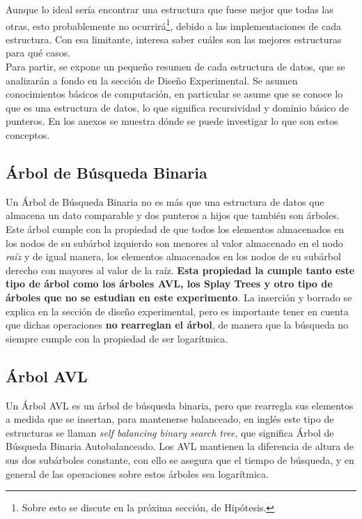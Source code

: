 \documentclass[12pt,letterpaper]{report}
\begin{document}
Aunque lo ideal sería encontrar una estructura que fuese mejor que todas las otras, esto probablemente no ocurrirá\footnote{Sobre esto se discute en la próxima sección, de Hipótesis.}, debido a las implementaciones de cada estructura. Con esa limitante, interesa saber cuáles son las mejores estructuras para qué casos.\\

Para partir, se expone un pequeño resumen de cada estructura de datos, que se analizarán a fondo en la sección de Diseño Experimental. Se asumen conocimientos básicos de computación, en particular se asume que se conoce lo que es una estructura de datos, lo que significa recursividad y dominio básico de punteros. En los anexos se muestra dónde se puede investigar lo que son estos conceptos.\\

\subsection{Árbol de Búsqueda Binaria}
\label{subsec:expl_abb}

Un Árbol de Búsqueda Binaria no es más que una estructura de datos que almacena un dato comparable y dos punteros a hijos que también son árboles. Este árbol cumple con la propiedad de que todos los elementos almacenados en los nodos de su subárbol izquierdo son menores al valor almacenado en el nodo \emph{raíz} y de igual manera, los elementos almacenados en los nodos de su subárbol derecho con mayores al valor de la raíz. \textbf{Esta propiedad la cumple tanto este tipo de árbol como los árboles AVL, los Splay Trees y otro tipo de árboles que no se estudian en este experimento}. La inserción y borrado se explica en la sección de diseño experimental, pero es importante tener en cuenta que dichas operaciones \textbf{no rearreglan el árbol}, de manera que la búsqueda no siempre cumple con la propiedad de ser logarítmica.

\subsection{Árbol AVL}
\label{subsec:expl_avl}
Un Árbol AVL es un árbol de búsqueda binaria, pero que rearregla sus elementos a medida que se insertan, para mantenerse balanceado, en inglés este tipo de estructuras se llaman \emph{self balancing binary search tree}, que significa Árbol de Búsqueda Binaria Autobalanceado. Los AVL mantienen la diferencia de altura de sus dos subárboles constante, con ello se asegura que el tiempo de búsqueda, y en general de las operaciones sobre estos árboles sea logarítmica.
\end{document}
